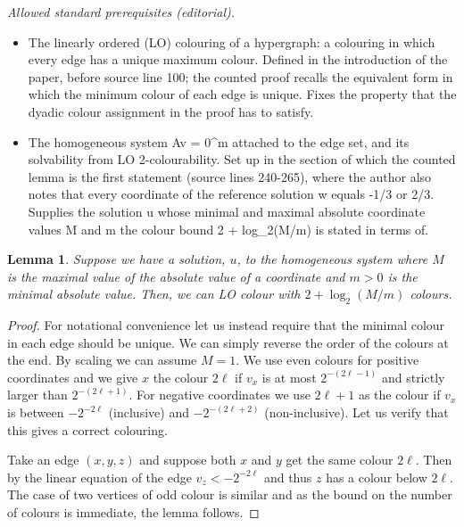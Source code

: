 \documentclass[10pt,a4paper]{article}
\theoremstyle{plain}
\newtheorem{lemma}[theorem]{Lemma}
\theoremstyle{definition}
\begin{document}
\noindent\textit{Allowed standard prerequisites (editorial).}\begin{itemize}
\item The linearly ordered (LO) colouring of a hypergraph: a colouring in which every edge has a unique maximum colour. Defined in the introduction of the paper, before source line 100; the counted proof recalls the equivalent form in which the minimum colour of each edge is unique. Fixes the property that the dyadic colour assignment in the proof has to satisfy.
\item The homogeneous system Av = 0\textasciicircum{}m attached to the edge set, and its solvability from LO 2-colourability. Set up in the section of which the counted lemma is the first statement (source lines 240-265), where the author also notes that every coordinate of the reference solution w equals -1/3 or 2/3. Supplies the solution u whose minimal and maximal absolute coordinate values M and m the colour bound 2 + log\_2(M/m) is stated in terms of.
\end{itemize}\medskip
\begin{lemma}\label{lemma:unbal}
Suppose we have a solution, $u$, to the homogeneous system where $M$
is the maximal value of the absolute value of a coordinate
and $m > 0$ is the minimal absolute value.  Then, we can
LO colour with $2+\log_2{(M/m)}$ colours.
\end{lemma}

\begin{proof} For notational convenience let us instead require that the
minimal colour in each edge should be unique. We can simply reverse
the order of the colours at the end.  By scaling we can assume $M=1$.
We use even colours for positive coordinates and we
give $x$ the colour $2\ell$ if $v_x$ is at most $2^{-(2\ell-1)}$
and strictly larger than $2^{-(2\ell+1)}$.
For negative coordinates we use $2\ell+1$ as
the colour if $v_x$ is between $-2^{-2\ell}$ (inclusive)
and $-2^{-(2\ell+2)}$ (non-inclusive).
Let us verify that this gives a correct
colouring.

Take an edge $(x,y,z)$ and suppose both $x$ and $y$
get the same colour $2\ell$.   Then by the linear equation of the edge $v_z < -2^{-2\ell}$ and thus $z$ has a colour below $2\ell$.  The case
of two vertices of odd colour is similar and as the bound on the number of colours is immediate, the lemma follows.
\end{proof}
\end{document}
